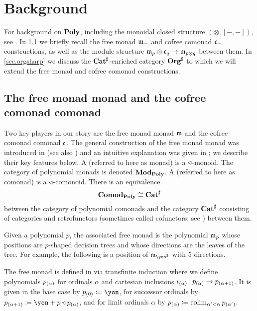 \chapter{Background} \label{sec:background}

For background on $\mathbf{Poly}$, including the monoidal closed structure $(\otimes,[-,-])$, see \cite{niu2022poly}. In \cref{sec.(co)free(co)monad} we briefly recall the free monad $\mathfrak{m}_-$ and cofree comonad $\mathfrak{c}_-$ constructions, as well as the module structure $\mathfrak{m}_p\otimes\mathfrak{c}_q\to\mathfrak{m}_{p\otimes q}$ between them. In \cref{sec.orgsharp} we discuss the $\mathbf{Cat}^\sharp$-enriched category $\mathbf{Org}^\sharp$ to which we will extend the free monad and cofree comonad constructions.


\section{The free monad monad and the cofree comonad comonad}\label{sec.(co)free(co)monad}

Two key players in our story are the free monad monad $\mathfrak{m}$ and the cofree comonad comonad $\mathfrak{c}$. The general construction of the free monad monad was introduced in \cite{kelly1980unified} (see also \cite{nlab:transfinite_construction_of_free_algebras}) and an intuitive explanation was given in \cite{libkind2024pattern}; we describe their key features below. A  (referred to here as monad) is a $\mathbin{\triangleleft}$-monoid. The category of polynomial monads is denoted $\mathbf{Mod}_{\mathbf{Poly}}$. A  (referred to here as comonad) is a $\mathbin{\triangleleft}$-comonoid. There is an equivalence
\[
    \mathbf{Comod}_{\mathbf{Poly}}\cong\mathbf{Cat}^\sharp
\]
between the category of polynomial comonads and the category $\mathbf{Cat}^\sharp$ consisting of categories and retrofunctors (sometimes called cofunctors; see \cite{aguiar1997internal,clarke2022introduction,nlab:retrofunctor}) between them.

Given a polynomial $p$, the associated free monad is the polynomial $\mathfrak{m}_p$ whose positions are $p$-shaped decision trees and whose directions are the leaves of the tree. For example, the following is a position of $\free_{\yon^2}$ with $5$ directions. 



The free monad is defined in \cite{libkind2024pattern} via transfinite induction where we define polynomials $p_{(\alpha)}$ for ordinals $\alpha$ and cartesian inclusions $\iota_{(\alpha)}\colon p_{(\alpha)} \to p_{(\alpha +1)}$. It is given in the base case by $p\hoc{0} \coloneqq \yon$, for successor ordinals by $p\hoc{\alpha + 1} \coloneqq \yon + p \tri p\hoc{\alpha}$, and for limit ordinals $\alpha$ by $p_{(\alpha)} \coloneqq \operatorname*{colim}_{\alpha' < \alpha} p _{(\alpha')}$. 


